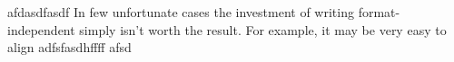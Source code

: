 afdasdfasdf
In few unfortunate cases the investment of writing format-independent \latex simply isn't worth the result. For example, it may be very easy to align adfsfasdhffff
afsd